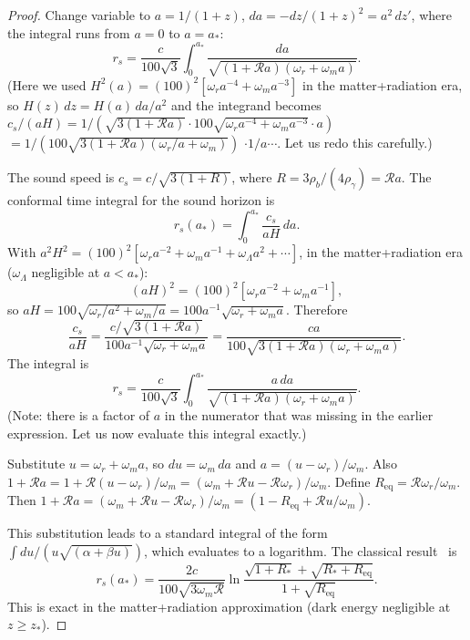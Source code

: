 \documentclass[12pt]{article}
\theoremstyle{plain}
\theoremstyle{definition}
\numberwithin{equation}{section}
\begin{document}
\begin{proof}
Change variable to $a=1/(1+z)$, $da=-dz/(1+z)^2=a^2\,dz'$, where the
integral runs from $a=0$ to $a=a_*$:
\begin{equation}
r_s = \frac{c}{100\sqrt{3}}\int_0^{a_*}
\frac{da}{\sqrt{(1+\mathcal{R}a)(\omega_r+\omega_m a)}}.
\end{equation}
(Here we used $H^2(a)=(100)^2[\omega_r a^{-4}+\omega_m a^{-3}]$ in the
matter+radiation era, so $H(z)\,dz=H(a)\,da/a^2$ and the integrand becomes
$c_s/(aH)=1/(\sqrt{3(1+\mathcal{R}a)}\cdot100\sqrt{\omega_r a^{-4}+\omega_m a^{-3}}\cdot a)$
$=1/(100\sqrt{3(1+\mathcal{R}a)(\omega_r/a+\omega_m)})$
$\cdot 1/a\cdots$. Let us redo this carefully.)

The sound speed is $c_s=c/\sqrt{3(1+R)}$, where $R=3\rho_b/(4\rho_\gamma)=\mathcal{R}a$.
The conformal time integral for the sound horizon is
\begin{equation}
r_s(a_*) = \int_0^{a_*}\frac{c_s}{aH}\,da.
\end{equation}
With $a^2H^2=(100)^2[\omega_r a^{-2}+\omega_m a^{-1}+\omega_\Lambda a^2+\cdots]$,
in the matter+radiation era ($\omega_\Lambda$ negligible at $a<a_*$):
\begin{equation}
(aH)^2 = (100)^2[\omega_r a^{-2}+\omega_m a^{-1}],
\end{equation}
so $aH=100\sqrt{\omega_r/a^2+\omega_m/a}=100a^{-1}\sqrt{\omega_r+\omega_m a}$.
Therefore
\begin{equation}
\frac{c_s}{aH} = \frac{c/\sqrt{3(1+\mathcal{R}a)}}{100a^{-1}\sqrt{\omega_r+\omega_m a}}
= \frac{ca}{100\sqrt{3(1+\mathcal{R}a)(\omega_r+\omega_m a)}}.
\end{equation}
The integral is
\begin{equation}
r_s = \frac{c}{100\sqrt{3}}\int_0^{a_*}
\frac{a\,da}{\sqrt{(1+\mathcal{R}a)(\omega_r+\omega_m a)}}.
\end{equation}
(Note: there is a factor of $a$ in the numerator that was missing in the
earlier expression.  Let us now evaluate this integral exactly.)

Substitute $u=\omega_r+\omega_m a$, so $du=\omega_m\,da$ and
$a=(u-\omega_r)/\omega_m$.  Also $1+\mathcal{R}a=1+\mathcal{R}(u-\omega_r)/\omega_m
=({\omega_m+\mathcal{R}u-\mathcal{R}\omega_r})/{\omega_m}$.
Define $R_{\mathrm{eq}}=\mathcal{R}\omega_r/\omega_m$.  Then
$1+\mathcal{R}a=(\omega_m+\mathcal{R}u-\mathcal{R}\omega_r)/\omega_m
=(1-R_{\mathrm{eq}}+\mathcal{R}u/\omega_m)$.

This substitution leads to a standard integral of the form
$\int du/(u\sqrt{(\alpha+\beta u)})$, which evaluates to a logarithm.
The classical result~\cite{HuSugiyama1996,EisensteinHu1998} is
\begin{equation}
r_s(a_*) = \frac{2c}{100\sqrt{3\omega_m\mathcal{R}}}
\ln\frac{\sqrt{1+R_*}+\sqrt{R_*+R_{\mathrm{eq}}}}{1+\sqrt{R_{\mathrm{eq}}}}.
\end{equation}
This is exact in the matter+radiation approximation (dark energy negligible
at $z\geq z_*$).
\end{proof}
\end{document}
